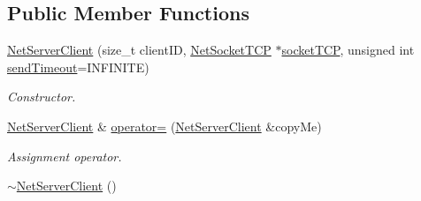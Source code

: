 \subsection*{Public Member Functions}
\begin{DoxyCompactItemize}
\item 
\hyperlink{class_net_server_client_a957dbcb8667f54554d959803bccdf068}{NetServerClient} (size\_\-t clientID, \hyperlink{class_net_socket_t_c_p}{NetSocketTCP} $\ast$\hyperlink{class_net_instance_implemented_t_c_p_adb7cac7d6ca26729e2eb83ae7f6ad984}{socketTCP}, unsigned int \hyperlink{class_net_instance_a39ed2f4325ce50a7c374ab6253650608}{sendTimeout}=INFINITE)
\begin{DoxyCompactList}\small\item\em Constructor. \item\end{DoxyCompactList}\item 
\hyperlink{class_net_server_client}{NetServerClient} \& \hyperlink{class_net_server_client_a7ad5475101f493b1dff7762b612edbdf}{operator=} (\hyperlink{class_net_server_client}{NetServerClient} \&copyMe)
\begin{DoxyCompactList}\small\item\em Assignment operator. \item\end{DoxyCompactList}\item 
\hypertarget{class_net_server_client_a9115b592671ba479cc019c34951e900a}{
\hyperlink{class_net_server_client_a9115b592671ba479cc019c34951e900a}{$\sim$NetServerClient} ()}
\label{class_net_server_client_a9115b592671ba479cc019c34951e900a}


\end{DoxyCompactItemize}
